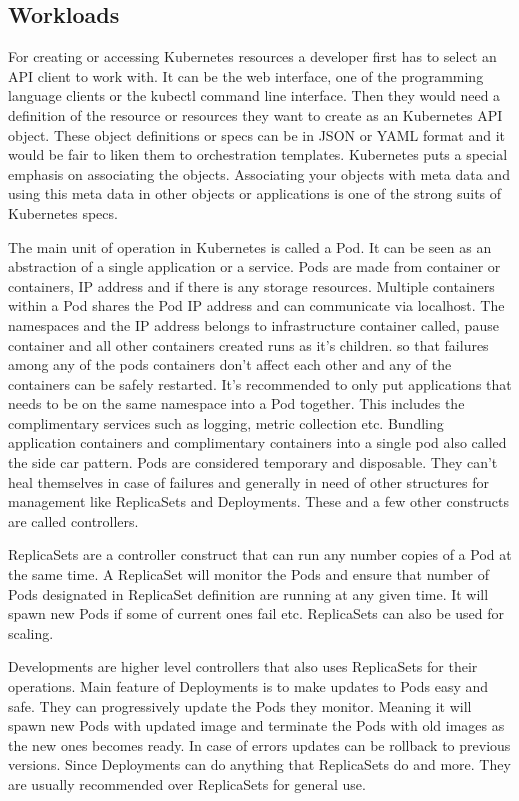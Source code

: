 \documentclass[12pt,oneandhalf,chaparabic,ceng,ms,eng,oneside,pntc]{gsufbe}
\begin{document}
\subsection{Workloads}
For creating or accessing Kubernetes resources a developer first has to select an API client to work
with. It can be the web interface, one of the programming language clients or the kubectl command line
interface. Then they would need a definition of the resource or resources they want to create as an
Kubernetes API object. These object definitions or specs can be in JSON or YAML format and it would be
fair to liken them to orchestration templates. Kubernetes puts a special emphasis on associating the
objects. Associating your objects with meta data and using this meta data in other objects or
applications is one of the strong suits of Kubernetes specs.

The main unit of operation in Kubernetes is called a Pod. It can be seen as an abstraction of a single
application or a service. Pods are made from container or containers, IP address and if there is any
storage resources. Multiple containers within a Pod shares the Pod IP address and can communicate via
localhost. The namespaces and the IP address belongs to infrastructure container called, pause 
container and all other containers created runs as it’s children. so that failures among any of the 
pods containers don't affect each other and any of the containers can be safely restarted. It's 
recommended to only put applications that needs to be on the same namespace into a Pod together. This
includes the complimentary services such as logging, metric collection etc. Bundling application
containers and complimentary containers into a single pod also called the side car pattern. Pods are
considered temporary and disposable. They can’t heal themselves in case of failures and generally in
need of other structures for management like ReplicaSets and Deployments. These and a few other
constructs are called controllers.

ReplicaSets are a controller construct that can run any number copies of a Pod at the same time. A 
ReplicaSet will monitor the Pods and ensure that number of Pods designated in ReplicaSet definition are
running at any given time. It will spawn new Pods if some of current ones fail etc. ReplicaSets can
also be used for scaling. 

Developments are higher level controllers that also uses ReplicaSets for their operations. Main feature
of Deployments is to make updates to Pods easy and safe. They can progressively update the Pods they
monitor. Meaning it will spawn new Pods with updated image and terminate the Pods with old images as
the new ones becomes ready. In case of errors updates can be rollback to previous versions. Since
Deployments can do anything that ReplicaSets do and more. They are usually recommended over ReplicaSets
for general use.
\end{document}
